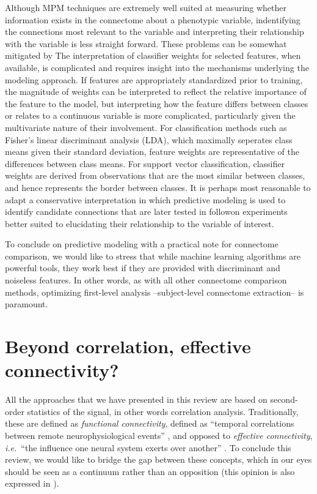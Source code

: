 \documentclass[5p]{elsarticle}
\begin{document}
Although MPM techniques are extremely well suited at measuring whether
information exists in the connectome about a phenotypic variable, indentifying the
connections most relevant to the variable and interpreting their relationship
with the variable is less straight forward. These problems can be somewhat mitigated by
The interpretation of classifier weights for selected features, when available,
is complicated and requires insight into the mechanisms underlying the modeling
approach. If features are appropriately standardized prior to training, the
magnitude of weights can be interpreted to reflect the relative importance of
the feature to the model, but interpreting how the feature differs between
classes or relates to a continuous variable is more complicated, particularly
given the multivariate nature of their involvement.  For classification methods
such as Fisher's linear discriminant analysis (LDA), which maximally seperates
class means given their standard deviation, feature weights are representative
of the differences between class means. For support vector classification,
classifier weights are derived from observations that are the most similar
between classes, and hence represents the border between classes.  It is perhaps
most reasonable to adapt a conservative interpretation in which predictive
modeling is used to identify candidate connections that are later tested in
followon experiments better suited to elucidating their relationship to the
variable of interest.


To conclude on predictive modeling with a practical note for connectome
comparison, we would like to stress that while machine learning
algorithms are powerful tools, they work best if they are provided with
discriminant and noiseless features. In other words, as with all other
connectome comparison methods, optimizing first-level analysis
--subject-level connectome extraction-- is paramount.


\section{Beyond correlation, effective connectivity?}

All the approaches that we have presented in this review are based on
second-order statistics of the signal, in other words correlation
analysis. Traditionally, these are defined as \emph{functional
connectivity}, defined as ``temporal correlations between remote
neurophysiological events'' \cite{friston1994}, and opposed to
\emph{effective connectivity}, \emph{i.e.}\ ``the influence one neural
system exerts over another'' \cite{friston1994}. To conclude this review,
we would like to bridge the gap between these concepts, which in our eyes
should be seen as a continuum rather than an opposition (this opinion is
also expressed in \cite{mcintosh2010}).
\end{document}
